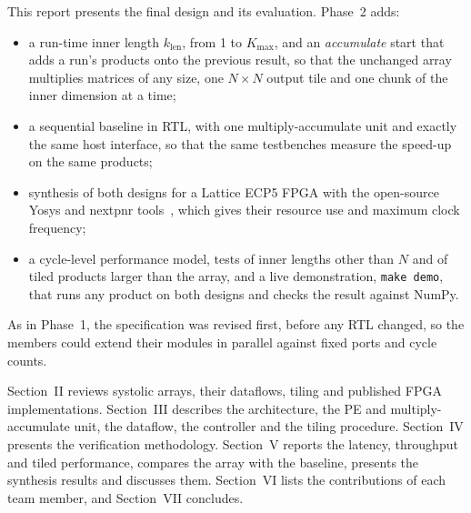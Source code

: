 This report presents the final design and its evaluation. Phase~2 adds:
\begin{itemize}
\item a run-time inner length $k_{\mathrm{len}}$, from 1 to $K_{\max}$, and an \emph{accumulate} start that adds a run's products onto the previous result, so that the unchanged array multiplies matrices of any size, one $N \times N$ output tile and one chunk of the inner dimension at a time;
\item a sequential baseline in RTL, with one multiply-accumulate unit and exactly the same host interface, so that the same testbenches measure the speed-up on the same products;
\item synthesis of both designs for a Lattice ECP5 FPGA with the open-source Yosys and nextpnr tools~\cite{wolf2013yosys, shah2019yosysnextpnr}, which gives their resource use and maximum clock frequency;
\item a cycle-level performance model, tests of inner lengths other than $N$ and of tiled products larger than the array, and a live demonstration, \texttt{make demo}, that runs any product on both designs and checks the result against NumPy.
\end{itemize}
As in Phase~1, the specification was revised first, before any RTL changed, so the members could extend their modules in parallel against fixed ports and cycle counts.

Section~II reviews systolic arrays, their dataflows, tiling and published FPGA implementations. Section~III describes the architecture, the PE and multiply-accumulate unit, the dataflow, the controller and the tiling procedure. Section~IV presents the verification methodology. Section~V reports the latency, throughput and tiled performance, compares the array with the baseline, presents the synthesis results and discusses them. Section~VI lists the contributions of each team member, and Section~VII concludes.
